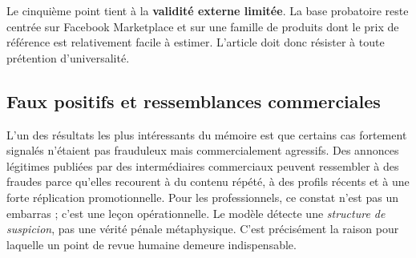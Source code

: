 \documentclass[10pt,a4paper]{article}
\begin{document}
Le cinquième point tient à la \textbf{validité externe limitée}. La base probatoire reste centrée sur Facebook Marketplace et sur une famille de produits dont le prix de référence est relativement facile à estimer. L'article doit donc résister à toute prétention d'universalité.

\subsection{Faux positifs et ressemblances commerciales}
L'un des résultats les plus intéressants du mémoire est que certains cas fortement signalés n'étaient pas frauduleux mais commercialement agressifs. Des annonces légitimes publiées par des intermédiaires commerciaux peuvent ressembler à des fraudes parce qu'elles recourent à du contenu répété, à des profils récents et à une forte réplication promotionnelle. Pour les professionnels, ce constat n'est pas un embarras ; c'est une leçon opérationnelle. Le modèle détecte une \emph{structure de suspicion}, pas une vérité pénale métaphysique. C'est précisément la raison pour laquelle un point de revue humaine demeure indispensable.
\end{document}
